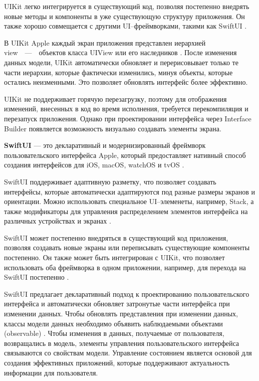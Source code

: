 UIKit легко интегрируется в существующий код, позволяя постепенно внедрять новые методы и компоненты в уже существующую структуру приложения. 
Он также хорошо совмещается с другими UI--фреймворками, такими как SwiftUI \cite{uikit-integr}.

В UIKit Apple каждый экран приложения представлен иерархией view~~---~~объектов класса UIView или его наследников \cite{uikit-uiview}. 
После изменения данных модели, UIKit автоматически обновляет и перерисовывает только те части иерархии, которые фактически изменились, минуя объекты, которые остались неизменными.
Это позволяет обновлять интерфейс более эффективно.

UIKit не поддерживает горячую перезагрузку, поэтому для отображения изменений, внесенных в код во время исполнения, требуется перекомпиляция и перезапуск приложения.
Однако при проектировании интерфейса через Interface Builder появляется возможность визуально создавать элементы экрана.


\textbf{SwiftUI} --- это декларативный и модернизированный фреймворк пользовательского интерфейса Apple, который предоставляет нативный способ создания интерфейсов для iOS, macOS, watchOS и tvOS \cite{swiftui}.

SwiftUI поддерживает адаптивную разметку, что позволяет создавать интерфейсы, которые автоматически адаптируются под разные размеры экранов и ориентации. 
Можно использовать специальное UI--элеменеты, например, Stack, а также модификаторы для управления распределением элементов интерфейса на различных устройствах и экранах \cite{swiftui-stack}.

SwiftUI может постепенно внедряться в существующий код приложения, позволяя создавать новые экраны или переписывать существующие компоненты постепенно. 
Он также может быть интегрирован с UIKit, что позволяет использовать оба фреймворка в одном приложении, например, для перехода на SwiftUI постепенно \cite{uikit-integr}.

SwiftUI предлагает декларативный подход к проектированию пользовательского интерфейса и автоматически обновляет затронутые части интерфейса при изменении данных.
Чтобы обновлять представления при изменении данных, классы модели данных необходимо объявить наблюдаемыми объектами (observable) \cite{swiftui-observ}.
Чтобы изменения в данных, получаемые от пользователя, возвращались в модель, элементы управления пользовательского интерфейса связываются со свойствам модели.
Управление состоянием является основой для создания эффективных приложений, которые поддерживают актуальность информации для пользователя.

